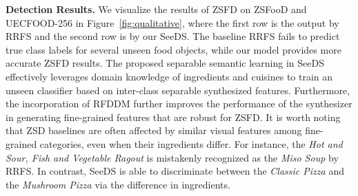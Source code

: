 \noindent\textbf{Detection Results.}
We visualize the results of ZSFD on ZSFooD and UECFOOD-256 in Figure~\ref{fig:qualitative}, where the first row is the output by RRFS and the second row is by our SeeDS. The baseline RRFS fails to predict true class labels for several unseen food objects, while our model provides more accurate ZSFD results. The proposed separable semantic learning in SeeDS effectively leverages domain knowledge of ingredients and cuisines to train an unseen classifier based on inter-class separable synthesized features. Furthermore, the incorporation of RFDDM further improves the performance of the synthesizer in generating fine-grained features that are robust for ZSFD. It is worth noting that ZSD baselines are often affected by similar visual features among fine-grained categories, even when their ingredients differ. For instance, the \emph{Hot and Sour, Fish and Vegetable Ragout} is mistakenly recognized as the \emph{Miso Soup} by RRFS. In contrast, SeeDS is able to discriminate between the \emph{Classic Pizza} and the \emph{Mushroom Pizza} via the difference in ingredients.